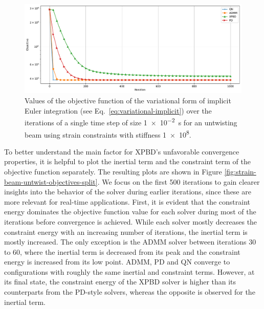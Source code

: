 \begin{figure}[h]
    \includegraphics[width=\textwidth]{figures/strain_beam_untwist_objectives.pdf}
    \caption{Values of the objective function of the variational form of implicit Euler integration (see Eq.\ \ref{eq:variational-implicit}) over the iterations of a single time 
        step of size \SI{1e-2}{\second} for an untwisting beam using strain constraints with stiffness \num{1e8}.}
    \label{fig:strain-beam-untwist-objectives}
\end{figure}


To better understand the main factor for XPBD's unfavorable convergence properties, it is helpful to plot the inertial term and the constraint term of the objective 
function separately. The resulting plots are shown in Figure \ref{fig:strain-beam-untwist-objectives-split}. 
We focus on the first 500 iterations to gain clearer insights into the behavior of the solver during earlier iterations, since these are more relevant for 
real-time applications. First, it is evident that the constraint energy dominates the objective function value for each solver during most of the iterations before 
convergence is achieved. While each solver mostly decreases the constraint energy with an increasing number of iterations, the inertial term is mostly increased. 
The only exception is the ADMM solver between iterations 30 to 60, where the inertial term is decreased from its peak and the constraint energy is increased from its 
low point. ADMM, PD and QN converge to configurations with roughly the same inertial and constraint terms. However, at its final state, the constraint 
energy of the XPBD solver is higher than its counterparts from the PD-style solvers, whereas the opposite is observed for the inertial term. 

